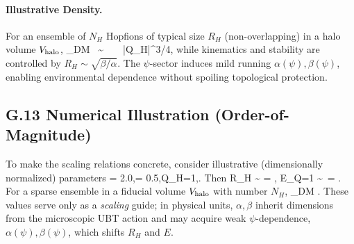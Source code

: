\paragraph{Illustrative Density.} For an ensemble of $N_H$ Hopfions of typical size $R_H$ (non-overlapping) in a halo volume $V_{\rm halo}$,
\rho_{\rm DM} \;\approx\;  \ \sim\  \ \kappa\, \sqrt{\alpha\beta}\, |Q_H|^{3/4},
while kinematics and stability are controlled by $R_H\!\sim\!\sqrt{\beta/\alpha}$. The $\psi$-sector induces mild running $\alpha(\psi),\beta(\psi)$, enabling environmental dependence without spoiling topological protection.
\subsection*{G.13 Numerical Illustration (Order-of-Magnitude)}
To make the scaling relations concrete, consider illustrative (dimensionally normalized) parameters
\alpha = 2.0,\qquad \beta = 0.5,\qquad Q_H=1,\qquad \kappa {}.
Then
R_H \sim \sqrt{\frac{\beta}{\alpha}} \;=\;  \;\approx{},\qquad
E_{Q=1} \sim \kappa\,\sqrt{\alpha\beta} \;=\;  \;\approx{}.
For a sparse ensemble in a fiducial volume $V_{\rm halo}$ with number $N_H$,
\rho_{\rm DM} \;\approx\;  \;\approx\; .
These values serve only as a \emph{scaling} guide; in physical units, $\alpha,\beta$ inherit dimensions from the microscopic UBT action and may acquire weak $\psi$-dependence, $\alpha(\psi),\beta(\psi)$, which shifts $R_H$ and $E$.